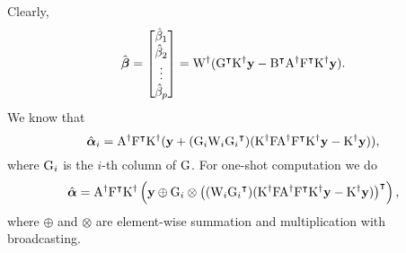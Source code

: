 \documentclass[twocolumn,draft]{article}
\begin{document}
Clearly,
\begin{equation*}
	\hat{\boldsymbol{\beta}} =
	\begin{bmatrix}
		\hat\beta_1 \\
		\hat\beta_2 \\
		\vdots \\
		\hat\beta_p
	\end{bmatrix}
	= {\mathrm{W}}^{\dagger}({\mathrm{G}}^\intercal{\mathrm{K}}^{\dagger}\mathbf{y}
	-{\mathrm{B}}^\intercal{\mathrm{A}}^{\dagger}{\mathrm{F}}^\intercal{\mathrm{K}}^{\dagger}\mathbf{y}).
\end{equation*}
We know that
\begin{equation*}
	\hat{\boldsymbol{\alpha}}_i = {\mathrm{A}}^{\dagger}{\mathrm{F}}^\intercal{\mathrm{K}}^{\dagger}
	(\mathbf{y} + (\mathrm{G}_i \mathrm{W}_i {\mathrm{G}_i}^\intercal)
	({\mathrm{K}}^{\dagger}\mathrm{F}{\mathrm{A}}^{\dagger}{\mathrm{F}}^\intercal{\mathrm{K}}^{\dagger}\mathbf{y} - {\mathrm{K}}^{\dagger}\mathbf{y})),
\end{equation*}
where $\mathrm{G}_i$ is the $i$-th column of $\mathrm{G}$.
For one-shot computation we do
\begin{equation*}
	\hat{\boldsymbol{\alpha}} = {\mathrm{A}}^{\dagger}{\mathrm{F}}^\intercal{\mathrm{K}}^{\dagger}
	\left(\mathbf{y} \oplus \mathrm{G}_i \otimes
	{\left((\mathrm{W}_i {\mathrm{G}_i}^\intercal)
	  ({\mathrm{K}}^{\dagger}\mathrm{F}{\mathrm{A}}^{\dagger}{\mathrm{F}}^\intercal{\mathrm{K}}^{\dagger}\mathbf{y}- {\mathrm{K}}^{\dagger}\mathbf{y})\right)}^\intercal\right),
\end{equation*}
where $\oplus$ and $\otimes$ are element-wise summation and multiplication
with broadcasting.


\printbibliography\
\end{document}
